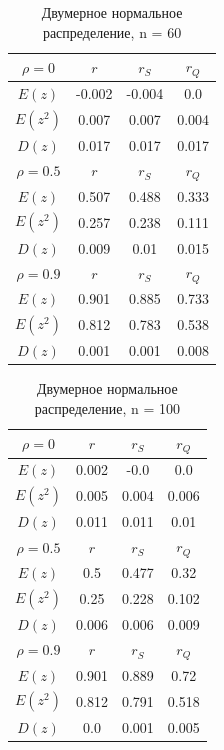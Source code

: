 \begin{table}[H]
	\centering
	\begin{tabular}{| c | c | c | c |}
		
		\hline
		$\rho = 0$ & $r$      & $r_S$  & $r_Q$ \\
		\hline
		$E(z)$     & -0.002 & -0.004 & 0.0   \\
		$E(z^2)$  & 0.007  & 0.007  & 0.004 \\
		$D(z)$    & 0.017  & 0.017  & 0.017 \\
		\hline
		$\rho = 0.5$ & $r$      & $r_S$  & $r_Q$ \\
		\hline
		$E(z)$       & 0.507 & 0.488 & 0.333 \\
		$E(z^2)$    & 0.257 & 0.238 & 0.111 \\
		$D(z)$      & 0.009 & 0.01  & 0.015 \\
		\hline
		$\rho = 0.9$ & $r$      & $r_S$  & $r_Q$ \\
		\hline
		$E(z)$       & 0.901 & 0.885 & 0.733 \\
		$E(z^2)$    & 0.812 & 0.783 & 0.538 \\
		$D(z)$      & 0.001 & 0.001 & 0.008 \\
		\hline
		
	\end{tabular}{}
	\caption{Двумерное нормальное распределение, n = 60}
	\label{tab:n60}
\end{table}



\begin{table}[H]
	\centering
	\begin{tabular}{| c | c | c | c |}
		
		\hline
		$\rho = 0$ & $r$      & $r_S$  & $r_Q$ \\
		\hline
		$E(z)$     & 0.002 & -0.0  & 0.0   \\
		$E(z^2)$  & 0.005 & 0.004 & 0.006 \\
		$D(z)$    & 0.011 & 0.011 & 0.01  \\
		\hline
		$\rho = 0.5$ & $r$      & $r_S$  & $r_Q$ \\
		\hline
		$E(z)$       & 0.5   & 0.477 & 0.32  \\
		$E(z^2)$    & 0.25  & 0.228 & 0.102 \\
		$D(z)$     & 0.006 & 0.006 & 0.009 \\
		\hline
		$\rho = 0.9$ & $r$      & $r_S$  & $r_Q$ \\
		\hline
		$E(z)$       & 0.901 & 0.889 & 0.72  \\
		$E(z^2)$    & 0.812 & 0.791 & 0.518 \\
		$D(z)$      & 0.0   & 0.001 & 0.005 \\
		\hline
		
	\end{tabular}{}
	\caption{Двумерное нормальное распределение, n = 100}
	\label{tab:n100}
\end{table}


